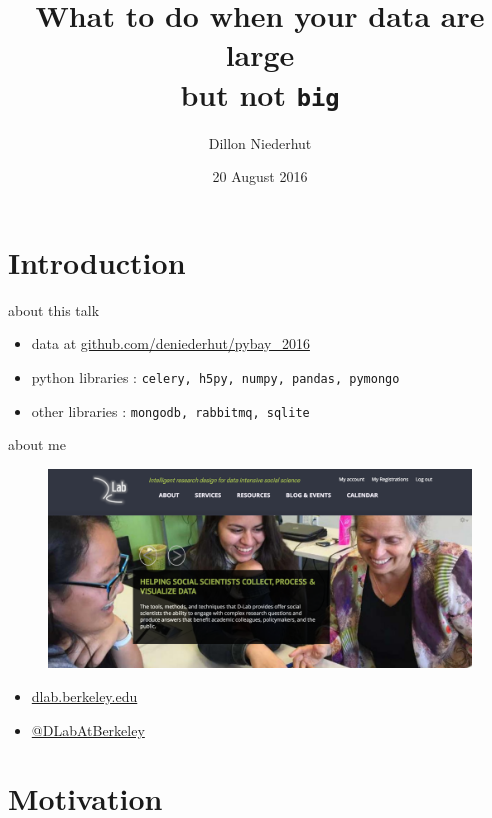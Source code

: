 \documentclass{beamer}
\title[Large data in python]{What to do when your data are \textbf{large} \\ but not \texttt{big}}
\author{Dillon Niederhut}
\institute{PyBay -- the San Francisco Bay Area Python Conference}
\date{20 August 2016}
\begin{document}
\begin{frame}
\titlepage
\end{frame}



\section{Introduction}

\begin{frame}{about this talk}
    \begin{itemize}
        \item data at \href{https://github.com/deniederhut/pybay_2016}{github.com/deniederhut/pybay\_2016}
        \item python libraries : \texttt{celery, h5py, numpy, pandas, pymongo}
        \item other libraries : \texttt{mongodb, rabbitmq, sqlite}
    \end{itemize}
\end{frame}

\begin{frame}{about me}
    \begin{figure}
        \centering
        \includegraphics[width=\textwidth]{dlab.png}
    \end{figure}
    \begin{itemize}
        \item \href{https://dlab.berkeley.edu}{dlab.berkeley.edu}
        \item \href{https://twitter.com/DLabAtBerkeley}{@DLabAtBerkeley}
    \end{itemize}
\end{frame}


\section{Motivation}
\end{document}
